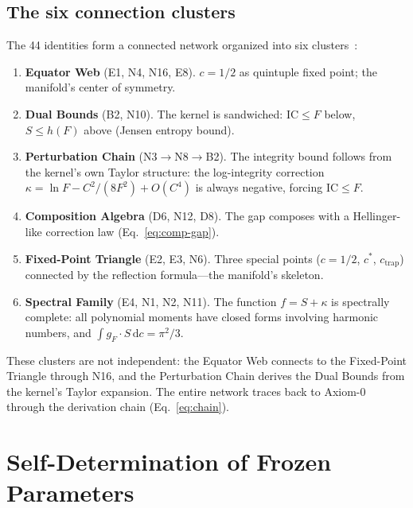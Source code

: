 \documentclass[
  aps,
  prd,
  twocolumn,
  superscriptaddress,
  nofootinbib,
  floatfix
]{revtex4-2}
\newcommand{\dd}{\mathrm{d}}
\newcommand{\IC}{\mathrm{IC}}
\newcommand{\gF}{g_{\!F}}
\begin{document}
\subsection{The six connection clusters}

The 44 identities form a connected network organized into six
clusters~\cite{umcpmetadatarepo}:

\begin{enumerate}[leftmargin=*,label=\textbf{\arabic*.}]
\item \textbf{Equator Web} (E1, N4, N16, E8).  $c = 1/2$ as
  quintuple fixed point; the manifold's center of symmetry.

\item \textbf{Dual Bounds} (B2, N10).  The kernel is sandwiched:
  $\IC \leq F$ below, $S \leq h(F)$ above (Jensen entropy bound).

\item \textbf{Perturbation Chain} (N3$\to$N8$\to$B2).  The integrity
  bound follows from the kernel's own Taylor structure: the
  log-integrity correction $\kappa = \ln F - C^2/(8F^2) + O(C^4)$
  is always negative, forcing $\IC \leq F$.

\item \textbf{Composition Algebra} (D6, N12, D8).  The gap composes
  with a Hellinger-like correction law (Eq.~\ref{eq:comp-gap}).

\item \textbf{Fixed-Point Triangle} (E2, E3, N6).  Three special
  points ($c = 1/2$, $c^*$, $c_{\mathrm{trap}}$) connected by the
  reflection formula---the manifold's skeleton.

\item \textbf{Spectral Family} (E4, N1, N2, N11).  The function
  $f = S + \kappa$ is spectrally complete: all polynomial moments
  have closed forms involving harmonic numbers, and $\int \gF \cdot
  S\,\dd c = \pi^2/3$.
\end{enumerate}

\noindent These clusters are not independent: the Equator Web connects
to the Fixed-Point Triangle through N16, and the Perturbation Chain
derives the Dual Bounds from the kernel's Taylor expansion.  The
entire network traces back to Axiom-0 through the derivation chain
(Eq.~\ref{eq:chain}).

\section{Self-Determination of Frozen Parameters}\label{sec:frozen}
\end{document}
